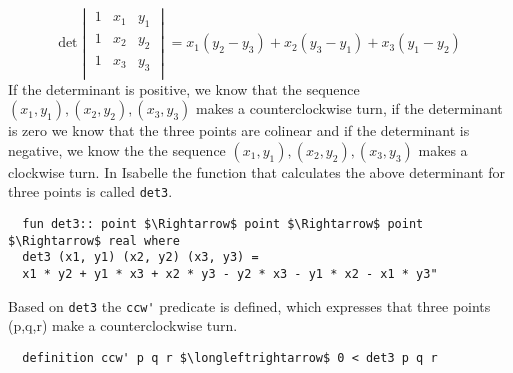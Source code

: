 \[
\text{det} 
\begin{vmatrix}
1 & x_1 & y_1 \\
1 & x_2 & y_2 \\
1 & x_3 & y_3 \\
\end{vmatrix}
= x_1 (y_2 - y_3 ) + x_2 (y_3 - y_1)+ x_3  (y_1 - y_2)
\]
If the determinant is positive, we know that the sequence $(x_1,y_1), (x_2,y_2) , (x_3,y_3)$
makes a counterclockwise turn, if the determinant is zero we know that the three points are colinear 
and if the determinant is negative, we know the the sequence $(x_1,y_1), (x_2,y_2) , (x_3,y_3)$
makes a clockwise turn. %
In Isabelle the function that calculates the above determinant for three 
points is called \lstinline|det3|.
\begin{lstlisting}
  fun det3:: point $\Rightarrow$ point $\Rightarrow$ point $\Rightarrow$ real where 
  det3 (x1, y1) (x2, y2) (x3, y3) =
  x1 * y2 + y1 * x3 + x2 * y3 - y2 * x3 - y1 * x2 - x1 * y3"
\end{lstlisting}
Based on \lstinline|det3| the \lstinline|ccw'| predicate is defined, which expresses that 
three points (p,q,r) make a counterclockwise turn.
\begin{lstlisting}
  definition ccw' p q r $\longleftrightarrow$ 0 < det3 p q r
\end{lstlisting}








